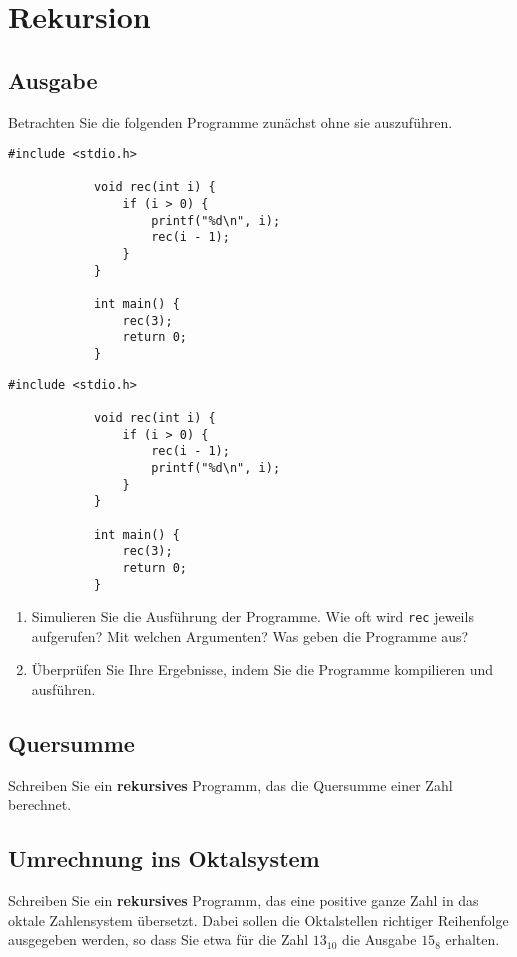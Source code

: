 \documentclass[]{article}
\begin{document}
	\section{Rekursion}
	
	\subsection{Ausgabe}
	
	Betrachten Sie die folgenden Programme zunächst ohne sie auszuführen.
	
	\noindent
	\begin{minipage}[t]{0.5\linewidth} %
		\begin{lstlisting}[gobble=6]
			#include <stdio.h>
			
			void rec(int i) {
				if (i > 0) {
					printf("%d\n", i);
					rec(i - 1);
				}
			}
			
			int main() {
				rec(3);
				return 0;
			}
		\end{lstlisting}
	\end{minipage}
	\quad
	\begin{minipage}[t]{0.5\linewidth} %
		\begin{lstlisting}[gobble=6]
			#include <stdio.h>
			
			void rec(int i) {
				if (i > 0) {
					rec(i - 1);
					printf("%d\n", i);
				}
			}
			
			int main() {
				rec(3);
				return 0;
			}
		\end{lstlisting}
	\end{minipage}
	
	\begin{enumerate}
		\item Simulieren Sie die Ausführung der Programme.
			Wie oft wird \texttt{rec} jeweils aufgerufen? 
			Mit welchen Argumenten?
			Was geben die Programme aus? 
		\item Überprüfen Sie Ihre Ergebnisse, indem Sie die Programme kompilieren und ausführen.
	\end{enumerate}
	
	\subsection{Quersumme}
	
	Schreiben Sie ein \textbf{rekursives} Programm, das die Quersumme einer Zahl berechnet.
	
	\subsection{Umrechnung ins Oktalsystem}
	
	Schreiben Sie ein \textbf{rekursives} Programm, das eine positive ganze Zahl in das oktale Zahlensystem übersetzt.
	Dabei sollen die Oktalstellen richtiger Reihenfolge ausgegeben werden, so dass Sie etwa für die Zahl $13_{10}$ die Ausgabe $15_8$ erhalten.
	
\end{document}
